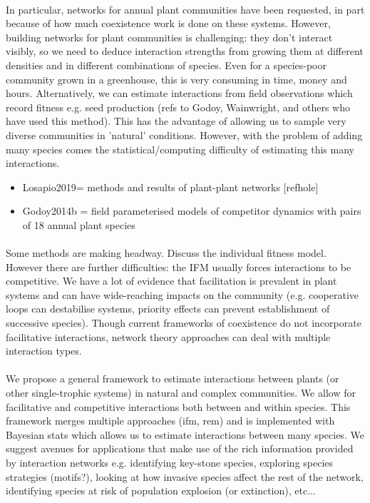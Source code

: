 \documentclass[a4,12pt]{article}
\begin{document}
    \paragraph{}
    In particular, networks for annual plant communities have been requested, in part because of how much coexistence work is done on these systems. However, building networks for plant communities is challenging: they don't interact visibly, so we need to deduce interaction strengths from growing them at different densities and in different combinations of species. Even for a species-poor community grown in a greenhouse, this is very consuming in time, money and hours. Alternatively, we can estimate interactions from field observations which record fitness e.g. seed production (refs to Godoy, Wainwright, and others who have used this method). This has the advantage of allowing us to sample very diverse communities in 'natural' conditions. However, with the problem of adding many species comes the statistical/computing difficulty of estimating this many interactions.
    \begin{itemize}
        \item Losapio2019= methods and results of plant-plant networks [refhole]
        \item Godoy2014b = field parameterised models of competitor dynamics with pairs of 18 annual plant species
    \end{itemize}

    \paragraph{}
    Some methods are making headway. Discuss the individual fitness model. However there are further difficulties: the IFM usually forces interactions to be competitive. We have a lot of evidence that facilitation is prevalent in plant systems and can have wide-reaching impacts on the community (e.g. cooperative loops can destabilise systems, priority effects can prevent establishment of successive species). Though current frameworks of coexistence do not incorporate facilitative interactions, network theory approaches can deal with multiple interaction types. 
    
    \paragraph{}
    We propose a general framework to estimate interactions between plants (or other single-trophic systems) in natural and complex communities. We allow for facilitative and competitive interactions both between and within species. 
    This framework merges multiple approaches (ifm, rem) and is implemented with Bayesian stats which allows us to estimate interactions between many species. 
    We suggest avenues for applications that make use of the rich information provided by interaction networks e.g. identifying key-stone species, exploring species strategies (motifs?), looking at how invasive species affect the rest of the network, identifying species at risk of population explosion (or extinction), etc...
\end{document}
